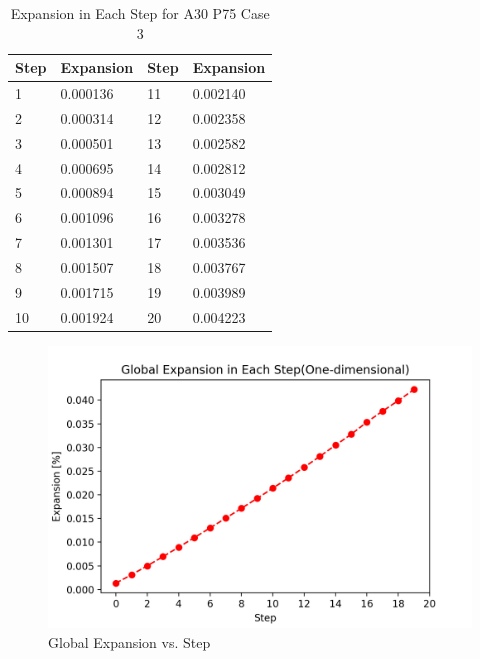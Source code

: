 

  \begin{table}[ht]
  \centering
  \begin{tabular}{ ||p{3cm}|p{3cm}||p{3cm}|p{3cm}|| }
  \hline
   Step &  Expansion & Step & Expansion \\
   \hline\hline
    1 & 0.000136  & 11 & 0.002140 \\
    2 & 0.000314  & 12 & 0.002358 \\
    3 & 0.000501  & 13 & 0.002582 \\
    4 & 0.000695  & 14 & 0.002812 \\
    5 & 0.000894  & 15 & 0.003049 \\
    6 & 0.001096  & 16 & 0.003278 \\
    7 & 0.001301  & 17 & 0.003536 \\
    8 & 0.001507  & 18 & 0.003767 \\
    9 & 0.001715  & 19 & 0.003989 \\
    10 & 0.001924  & 20  & 0.004223 \\
    \hline
    \end{tabular}
  \caption{Expansion in Each Step for A30 P75 Case 3}
  \label{table:A30P75_3_EXP}
  \end{table}

  \begin{figure}[ht!]
  \centering
  \includegraphics[width=.8\linewidth]{Files/exp_plot/ASRA30P75_3_exp.png}
    \caption{Global Expansion vs. Step}
    \label{fig:ASRA30P75_3_exp}
  \end{figure}


